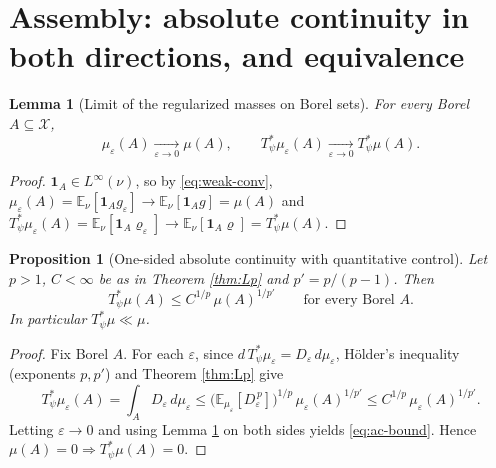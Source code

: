 \documentclass[12pt]{article}
\newcommand{\bE}{\mathbb{E}}
\newcommand{\eps}{\varepsilon}
\theoremstyle{plain}
\newtheorem{lemma}{Lemma}
\newtheorem{proposition}{Proposition}
\theoremstyle{definition}
\begin{document}
\section{Assembly: absolute continuity in both directions, and equivalence}
\label{sec:assembly}

\begin{lemma}[Limit of the regularized masses on Borel sets]\label{lem:massconv}
For every Borel $A\subseteq\mathcal X$,
\begin{equation}\label{eq:massconv}
\mu_\eps(A)\xrightarrow[\eps\to0]{}\mu(A),\qquad
T_\psi^\ast\mu_\eps(A)\xrightarrow[\eps\to0]{}T_\psi^\ast\mu(A).
\end{equation}
\end{lemma}

\begin{proof}
$\mathbf 1_A\in L^\infty(\nu)$, so by \eqref{eq:weak-conv},
$\mu_\eps(A)=\bE_\nu[\mathbf 1_A g_\eps]\to\bE_\nu[\mathbf 1_A g]=\mu(A)$ and
$T_\psi^\ast\mu_\eps(A)=\bE_\nu[\mathbf 1_A\varrho_\eps]\to\bE_\nu[\mathbf 1_A\varrho]=T_\psi^\ast\mu(A)$.
\end{proof}

\begin{proposition}[One-sided absolute continuity with quantitative control]\label{prop:ac}
Let $p>1$, $C<\infty$ be as in Theorem \ref{thm:Lp} and $p'=p/(p-1)$. Then
\begin{equation}\label{eq:ac-bound}
T_\psi^\ast\mu(A)\le C^{1/p}\,\mu(A)^{1/p'}\qquad\text{for every Borel }A .
\end{equation}
In particular $T_\psi^\ast\mu\ll\mu$.
\end{proposition}

\begin{proof}
Fix Borel $A$. For each $\eps$, since $d\,T_\psi^\ast\mu_\eps=D_\eps\,d\mu_\eps$,
H\"older's inequality (exponents $p,p'$) and Theorem \ref{thm:Lp} give
\[
T_\psi^\ast\mu_\eps(A)=\int_A D_\eps\,d\mu_\eps
\le\big(\bE_{\mu_\eps}[D_\eps^{\,p}]\big)^{1/p}\,\mu_\eps(A)^{1/p'}
\le C^{1/p}\,\mu_\eps(A)^{1/p'} .
\]
Letting $\eps\to0$ and using Lemma \ref{lem:massconv} on both sides yields
\eqref{eq:ac-bound}. Hence $\mu(A)=0\Rightarrow T_\psi^\ast\mu(A)=0$.
\end{proof}
\end{document}
